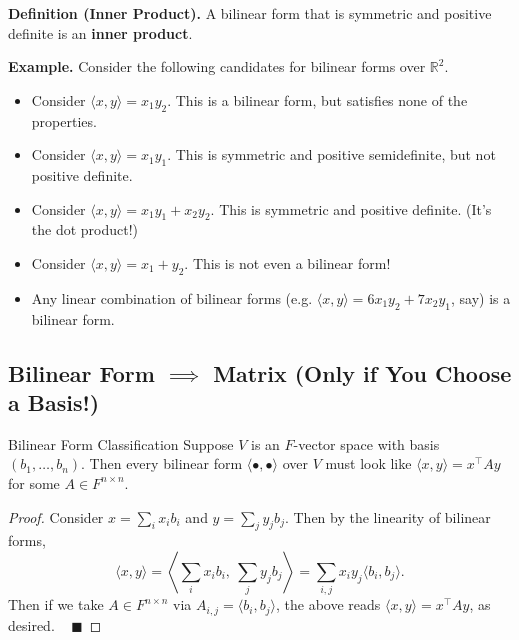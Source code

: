 \textbf{Definition (Inner Product).} A bilinear form that is symmetric and positive definite is an \textbf{inner product}.

\textbf{Example.} Consider the following candidates for bilinear forms over $\mathbb{R}^2$.
\begin{itemize}
    \item Consider $\langle x, y \rangle = x_1y_2$.  This is a bilinear form, but satisfies none of the properties.
    \item Consider $\langle x, y \rangle = x_1 y_1$.  This is symmetric and positive semidefinite, but not positive definite.
    \item Consider $\langle x, y \rangle = x_1 y_1 + x_2y_2$.  This is symmetric and positive definite.  (It's the dot product!)
    \item Consider $\langle x, y \rangle = x_1 + y_2$.  This is not even a bilinear form!
    \item Any linear combination of bilinear forms (e.g. $\langle x, y \rangle = 6x_1y_2 + 7x_2y_1$, say) is a bilinear form.
\end{itemize}


\subsection{Bilinear Form $\implies$ Matrix (Only if You Choose a Basis!)}

\begin{theorem}{Bilinear Form Classification}
    Suppose $V$ is an $F$-vector space with basis $(b_1, \dots, b_n)$.  Then every bilinear form $\langle \bullet, \bullet \rangle$ over $V$ must look like $\langle x, y \rangle = x^{\top}Ay$ for some $A \in F^{n \times n}$.
\end{theorem}

\begin{proof}
    Consider $x = \sum_{i} x_i b_i$ and $y = \sum_j y_j b_j$.  Then by the linearity of bilinear forms, \vspace{-0.15cm}
    \[ \langle x, y \rangle = \left \langle \sum_i x_i b_i, \ \sum_j y_j b_j \right \rangle = \sum_{i, j} x_iy_j \langle b_i, b_j \rangle. \] \vspace{-0.15cm}
    Then if we take $A \in F^{n \times n}$ via $A_{i, j} = \langle b_i, b_j \rangle$, the above reads $\langle x, y \rangle = x^{\top}Ay$, as desired. ~ $\blacksquare$
\end{proof}

